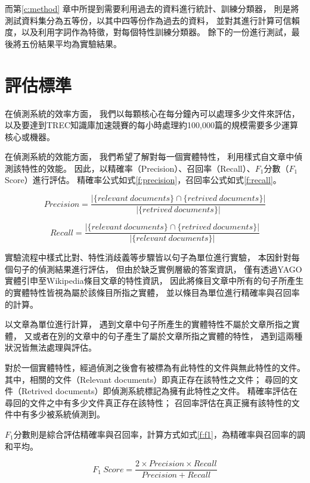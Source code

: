 而第\ref{c:method} 章中所提到需要利用過去的資料進行統計、訓練分類器，
則是將測試資料集分為五等份，以其中四等份作為過去的資料，
並對其進行計算可信賴度，以及利用字詞作為特徵，對每個特性訓練分類器。
餘下的一份進行測試，最後將五份結果平均為實驗結果。

\section{評估標準}
\label{s:eval}
在偵測系統的效率方面，
我們以每顆核心在每分鐘內可以處理多少文件來評估，
以及要達到TREC知識庫加速競賽的每小時處理約100,000篇的規模需要多少運算核心或機器。

在偵測系統的效能方面，
我們希望了解對每一個實體特性，
利用樣式自文章中偵測該特性的效能。
因此，以精確率（Precision）、召回率（Recall）、$F_1$分數（$F_1$ Score）進行評估。
精確率公式如式\ref{f:precision}，召回率公式如式\ref{f:recall}。

\begin{equation}
    \label{f:precision}
    Precision = \frac{|\{relevant\ documents\}\cap\{retrived\ documents\}|}{|\{retrived\ documents\}|}
\end{equation}

\begin{equation}
    \label{f:recall}
    Recall = \frac{|\{relevant\ documents\}\cap\{retrived\ documents\}|}{|\{relevant\ documents\}|}
\end{equation}

實驗流程中樣式比對、特性消歧義等步驟皆以句子為單位進行實驗，
本因針對每個句子的偵測結果進行評估，
但由於缺乏實例層級的答案資訊，
僅有透過YAGO實體引申至Wikipedia條目文章的特性資訊，
因此將條目文章中所有的句子所產生的實體特性皆視為屬於該條目所指之實體，
並以條目為單位進行精確率與召回率的計算。

以文章為單位進行計算，
遇到文章中句子所產生的實體特性不屬於文章所指之實體，
又或者在別的文章中的句子產生了屬於文章所指之實體的特性，
遇到這兩種狀況皆無法處理與評估。

對於一個實體特性，經過偵測之後會有被標為有此特性的文件與無此特性的文件。
其中，相關的文件（Relevant documents）即真正存在該特性之文件；
尋回的文件（Retrived documents）即偵測系統標記為擁有此特性之文件。
精確率評估在尋回的文件之中有多少文件真正存在該特性；
召回率評估在真正擁有該特性的文件中有多少被系統偵測到。

$F_1$分數則是綜合評估精確率與召回率，計算方式如式\ref{f:f1}，為精確率與召回率的調和平均。

\begin{equation}
    \label{f:f1}
    F_1\ Score = \frac{2\times Precision \times Recall}{Precision + Recall}
\end{equation}

